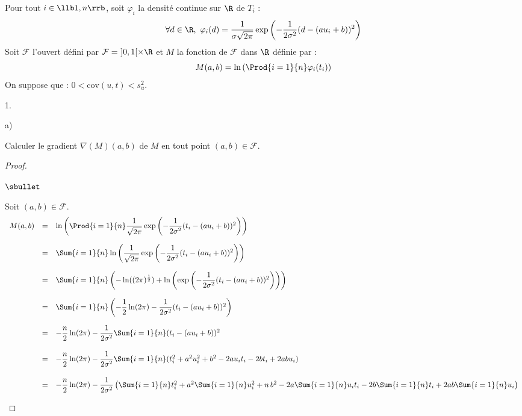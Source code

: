 \noindent
Pour tout $i \in \llb 1,n \rrb$, soit $\varphi_i$ la densité continue 
sur $\R$ de $T_i$ : 
\[
 \forall d \in \R, \ 
 \varphi_i(d)=\dfrac{1}{\sigma\sqrt{2\pi}}\exp\left(-\dfrac{1}{2\sigma^2
 } (d-(au_i+b))^2\right)
\]
Soit $\mathcal{F}$ l'ouvert défini par $\mathcal{F}= \ ]0,1[ \times \R$ 
et 
$M$ la fonction de $\mathcal{F}$ dans $\R$ définie par :
\[
 M(a,b)=\ln\left(\Prod{i=1}{n} \varphi_i(t_i)\right)
\]
On suppose que : $0 < \mathrm{cov}(u,t) < s_u^2$.

\begin{noliste}{1.}
 \setlength{\itemsep}{4mm}
 \setcounter{enumi}{9}
 \item 
 \begin{noliste}{a)}
  \setlength{\itemsep}{2mm}
  \item Calculer le gradient $\nabla(M)(a,b)$ de $M$ en tout point 
  $(a,b) \in \mathcal{F}$.
  
  \begin{proof}~
   \begin{noliste}{$\sbullet$}
    \item Soit $(a,b)\in\mathcal{F}$.
    \[
    \begin{array}{rcl}
      M(a,b) & = & \ln \left( \Prod{i=1}{n} \dfrac{1}{\sqrt{2\pi}}
        \exp\left(-\dfrac{1}{2\sigma^2}(t_i-(au_i+b))^2\right) \right) 
      \\[.6cm]
      &=& \Sum{i=1}{n} \ln \left( \dfrac{1}{\sqrt{2\pi}}
        \exp\left(-\dfrac{1}{2\sigma^2}(t_i-(au_i+b))^2\right) \right) 
      \\[.6cm]
      &=& \Sum{i=1}{n} \left( - \ln((2\pi)^{\frac{1}{2}}) +
      \ln\left( \exp\left(-\dfrac{1}{2\sigma^2}(t_i-(au_i+b))^2\right) 
      \right) \right)
      \\[.6cm]
      &=& \Sum{i=1}{n} \left( - \dfrac{1}{2} \ln(2\pi)
      -\dfrac{1}{2\sigma^2}(t_i-(au_i+b))^2\right)
      \\[.6cm]
      &=& -\dfrac{n}{2}\ln(2\pi)-\dfrac{1}{2\sigma^2}
	  \Sum{i=1}{n}(t_i-(au_i+b))^2
      \\[.6cm]
      &=& - \dfrac{n}{2} \ln(2\pi) - \dfrac{1}{2\sigma^2}
      \Sum{i=1}{n} (t_i^2 + a^2 u_i^2 + b^2 -2au_i t_i -2bt_i
      +2ab u_i)
      \\[.6cm]
      &=& - \dfrac{n}{2} \ln(2\pi) - \dfrac{1}{2\sigma^2}
      \left(\Sum{i=1}{n} t_i^2 + a^2 \Sum{i=1}{n} u_i^2 + n \, b^2 
      -2a \Sum{i=1}{n} u_i t_i -2b \Sum{i=1}{n} t_i
      +2ab \Sum{i=1}{n}u_i \right)
    \end{array}
    \]
    

\end{noliste}
\end{proof}
\end{noliste}
\end{noliste}
